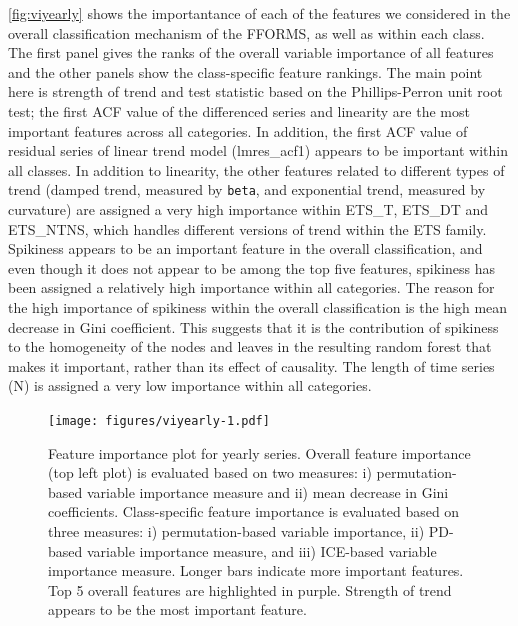 \documentclass[11pt,a4paper,]{article}
\begin{document}
\autoref{fig:viyearly} shows the importantance of each of the features we considered in the overall classification mechanism of the FFORMS, as well as within each class. The first panel gives the ranks of the overall variable importance of all features and the other panels show the class-specific feature rankings. The main point here is strength of trend and test statistic based on the Phillips-Perron unit root test; the first ACF value of the differenced series and linearity are the most important features across all categories.
In addition, the first ACF value of residual series of linear trend model (lmres\_acf1) appears to be important within all classes. In addition to linearity, the other features related to different types of trend (damped trend, measured by \texttt{beta}, and exponential trend, measured by curvature) are assigned a very high importance within ETS\_T, ETS\_DT and ETS\_NTNS, which handles different versions of trend within the ETS family. Spikiness appears to be an important feature in the overall classification, and even though it does not appear to be among the top five features, spikiness has been assigned a relatively high importance within all categories. The reason for the high importance of spikiness within the overall classification is the high mean decrease in Gini coefficient. This suggests that it is the contribution of spikiness to the homogeneity of the nodes and leaves in the resulting random forest that makes it important, rather than its effect of causality. The length of time series (N) is assigned a very low importance within all categories.

\begin{figure}
\centering
\texttt{[image: figures/viyearly-1.pdf]}
\caption{\label{fig:viyearly}Feature importance plot for yearly series. Overall feature importance (top left plot) is evaluated based on two measures: i) permutation-based variable importance measure and ii) mean decrease in Gini coefficients. Class-specific feature importance is evaluated based on three measures: i) permutation-based variable importance, ii) PD-based variable importance measure, and iii) ICE-based variable importance measure. Longer bars indicate more important features. Top 5 overall features are highlighted in purple. Strength of trend appears to be the most important feature.}
\end{figure}
\end{document}
